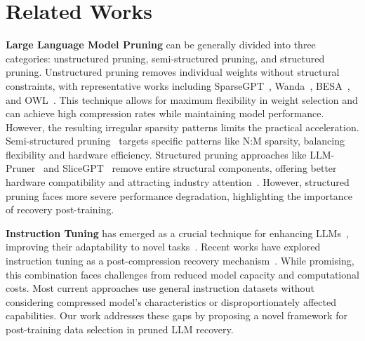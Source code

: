 \section{Related Works}
\textbf{Large Language Model Pruning} can be generally divided into three categories: unstructured pruning, semi-structured pruning, and structured pruning. Unstructured pruning removes individual weights without structural constraints, with representative works including SparseGPT~\citep{sparsegpt2023elias}, Wanda~\citep{wanda2024mingjie}, BESA~\citep{besa2024peng}, and OWL~\citep{owl2024lu}. This technique allows for maximum flexibility in weight selection and can achieve high compression rates while maintaining model performance. However, the resulting irregular sparsity patterns limits the practical acceleration. 
Semi-structured pruning~\citep{zhi2024dass, copal2024srikanth, sparsegpt2023elias, wanda2024mingjie} targets specific patterns like N:M sparsity, balancing flexibility and hardware efficiency. Structured pruning approaches like LLM-Pruner~\citep{ma2023llm} and SliceGPT~\citep{slidegpt2024saleh} remove entire structural components, offering better hardware compatibility and attracting industry attention~\citep{nash2023jongwoo, flap2024yongqi, sleb2024jiwon, sheared2024mengzhou}. However, structured pruning faces more severe performance degradation, highlighting the importance of recovery post-training.

\textbf{Instruction Tuning} has emerged as a crucial technique for enhancing LLMs~\citep{weifinetuned, wang2023self}, improving their adaptability to novel tasks~\citep{sanhmultitask, liangexploring, zhou2024lima}. Recent works have explored instruction tuning as a post-compression recovery mechanism~\citep{zhaolora, ma2023llm}. While promising, this combination faces challenges from reduced model capacity and computational costs. Most current approaches use general instruction datasets without considering compressed model's characteristics or disproportionately affected capabilities. Our work addresses these gaps by proposing a novel framework for post-training data selection in pruned LLM recovery.